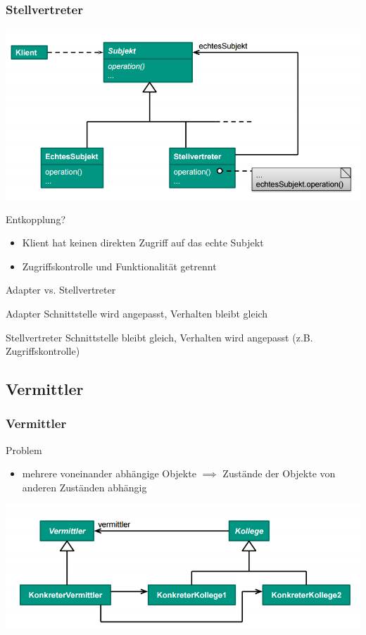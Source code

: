 \documentclass[18pt]{beamer}
\begin{document}
	\begin{frame}
		\frametitle{Stellvertreter}
		\centering
		\includegraphics[scale=0.4]{./pics/tut3/prox.png}
		\begin{block}{Entkopplung?}
			\begin{itemize}
				\pause 
				\item Klient hat keinen direkten Zugriff auf das echte Subjekt
				\item Zugriffskontrolle und Funktionalität getrennt
			\end{itemize}
		\end{block}
	\end{frame}

\begin{frame}{Adapter vs. Stellvertreter}
	\begin{block}{Adapter}
		Schnittstelle wird angepasst, Verhalten bleibt gleich
	\end{block}
	\begin{block}{Stellvertreter}
		Schnittstelle bleibt gleich, Verhalten wird angepasst (z.B. Zugriffskontrolle)
	\end{block}
\end{frame}


	\subsection{Vermittler}
		\begin{frame}
		\frametitle{Vermittler}
		\begin{block}{Problem}
			\begin{itemize}
				\item mehrere voneinander abhängige Objekte \linebreak \pause $\implies$ Zustände der Objekte von anderen Zuständen abhängig
			\end{itemize}
		\end{block}
		\pause
		\centering
		\includegraphics[scale=0.45]{./pics/tut3/med.png}
	\end{frame}
\end{document}
